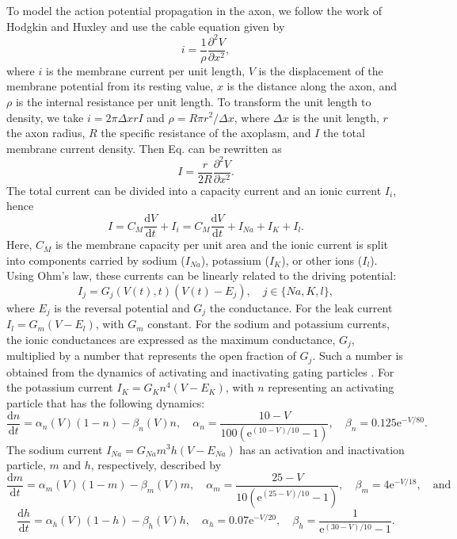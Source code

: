 \documentclass[11pt]{article}
\newcommand{\ee}{\mathrm{e}}
\begin{document}
To model the action potential propagation in the axon, we follow the work of Hodgkin and Huxley \cite{hodgkin1952quantitative} and use the cable equation given by
\begin{equation}\label{eq:i}
    i = \frac{1}{\rho} \frac{\partial^2 V}{\partial x^2},
\end{equation}
where $i$ is the membrane current per unit length, $V$ is the displacement of the membrane potential from its resting value, $x$ is the distance along the axon, and $\rho$ is the internal resistance per unit length. To transform the unit length to density, we take $i = 2 \pi \Delta x r I$ and $\rho = R \pi r^2/\Delta x$, where $\Delta x$ is the unit length, $r$ the axon radius, $R$ the specific resistance of the axoplasm, and $I$ the total membrane current density. Then Eq.  can be rewritten as
\begin{equation}
    I = \frac{r}{2R} \frac{\partial^2 V}{\partial x^2}.
\end{equation}
The total current can be divided into a capacity current and an ionic current $I_i$, hence
\begin{equation}
    I = C_M \frac{\mathrm{d}V}{\mathrm{d}t} + I_i = C_M \frac{\mathrm{d}V}{\mathrm{d}t} + I_{Na} + I_K + I_l.
\end{equation}
Here, $C_M$ is the membrane capacity per unit area and the ionic current is split into components carried by sodium ($I_{Na}$), potassium ($I_K$), or other ions ($I_l$). Using Ohm’s law, these currents can be linearly related to the driving potential:
\begin{equation}
    I_j = G_j(V(t),t)(V(t)-E_j),  \quad   j \in \{Na,K,l\},
\end{equation}
where $E_j$ is the reversal potential and $G_j$ the conductance. For the leak current $I_l = G_m(V-E_l)$, with $G_m$ constant. For the sodium and potassium currents, the ionic conductances are expressed as the maximum conductance, $G_j$, multiplied by a number that represents the open fraction of $G_j$. Such a number is obtained from the dynamics of activating and inactivating gating particles \cite{hodgkin1952quantitative,koch2004biophysics}. For the potassium current $I_K=G_Kn^4(V-E_K)$, with $n$ representing an activating particle that has the following dynamics: 
\begin{equation}
    \frac{\mathrm{d}n}{\mathrm{d}t} = \alpha_n(V)(1-n) - \beta_n(V)n, \quad \alpha_n = \frac{10-V}{100(\ee^{(10-V)/10}-1)}, \quad \beta_n = 0.125\ee^{-V/80}.
\end{equation}
The sodium current $I_{Na}= G_{Na}m^3h(V-E_{Na})$ has an activation and inactivation particle, $m$ and $h$, respectively, described by
\begin{equation}
    \frac{\mathrm{d}m}{\mathrm{d}t} = \alpha_m(V)(1-m) - \beta_m(V)m, \quad \alpha_m = \frac{25-V}{10(\ee^{(25-V)/10}-1)}, \quad \beta_m = 4\ee^{-V/18}, \quad \text{and}
\end{equation}
\begin{equation}
    \frac{\mathrm{d}h}{\mathrm{d}t} = \alpha_h(V)(1-h) - \beta_h(V)h, \quad \alpha_h = 0.07\ee^{-V/20}, \quad \beta_h = \frac{1}{\ee^{(30-V)/10}-1}.
\end{equation}
\end{document}
